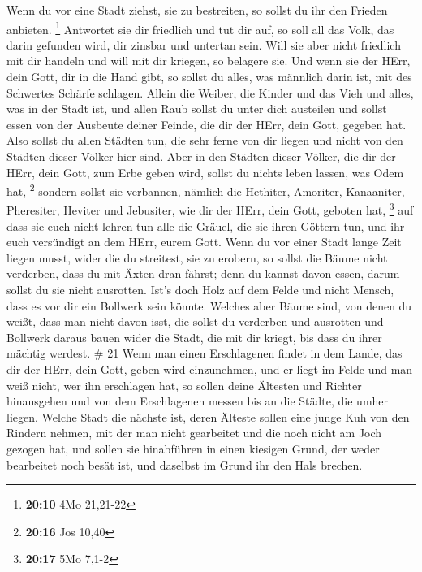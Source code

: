  Wenn du vor eine Stadt ziehst, sie zu bestreiten, so
sollst du ihr den Frieden anbieten. \footnote{\textbf{20:10} 4Mo
  21,21-22}  Antwortet sie dir friedlich und tut dir auf,
so soll all das Volk, das darin gefunden wird, dir zinsbar und untertan
sein.  Will sie aber nicht friedlich mit dir handeln und
will mit dir kriegen, so belagere sie.  Und wenn sie der
HErr, dein Gott, dir in die Hand gibt, so sollst du alles, was männlich
darin ist, mit des Schwertes Schärfe schlagen.  Allein die
Weiber, die Kinder und das Vieh und alles, was in der Stadt ist, und
allen Raub sollst du unter dich austeilen und sollst essen von der
Ausbeute deiner Feinde, die dir der HErr, dein Gott, gegeben hat.
 Also sollst du allen Städten tun, die sehr ferne von dir
liegen und nicht von den Städten dieser Völker hier sind. 
Aber in den Städten dieser Völker, die dir der HErr, dein Gott, zum Erbe
geben wird, sollst du nichts leben lassen, was Odem hat, \footnote{\textbf{20:16}
  Jos 10,40}  sondern sollst sie verbannen, nämlich die
Hethiter, Amoriter, Kanaaniter, Pheresiter, Heviter und Jebusiter, wie
dir der HErr, dein Gott, geboten hat, \footnote{\textbf{20:17} 5Mo 7,1-2}
 auf dass sie euch nicht lehren tun alle die Gräuel, die
sie ihren Göttern tun, und ihr euch versündigt an dem HErr, eurem Gott.
 Wenn du vor einer Stadt lange Zeit liegen musst, wider die
du streitest, sie zu erobern, so sollst die Bäume nicht verderben, dass
du mit Äxten dran fährst; denn du kannst davon essen, darum sollst du
sie nicht ausrotten. Ist's doch Holz auf dem Felde und nicht Mensch,
dass es vor dir ein Bollwerk sein könnte.  Welches aber
Bäume sind, von denen du weißt, dass man nicht davon isst, die sollst du
verderben und ausrotten und Bollwerk daraus bauen wider die Stadt, die
mit dir kriegt, bis dass du ihrer mächtig werdest. \# 21 
Wenn man einen Erschlagenen findet in dem Lande, das dir der HErr, dein
Gott, geben wird einzunehmen, und er liegt im Felde und man weiß nicht,
wer ihn erschlagen hat,  so sollen deine Ältesten und
Richter hinausgehen und von dem Erschlagenen messen bis an die Städte,
die umher liegen.  Welche Stadt die nächste ist, deren
Älteste sollen eine junge Kuh von den Rindern nehmen, mit der man nicht
gearbeitet und die noch nicht am Joch gezogen hat,  und
sollen sie hinabführen in einen kiesigen Grund, der weder bearbeitet
noch besät ist, und daselbst im Grund ihr den Hals brechen. 
